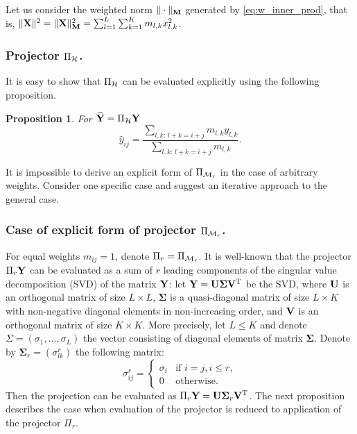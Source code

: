 \documentclass[sii]{ipart}
\newtheorem{proposition}{Proposition}
\begin{document}
Let us consider the weighted norm $\|\cdot\|_{\mathbf{M}}$ generated by \eqref{eq:w_inner_prod}, that is, $\|\mathbf{X}\|^2 = \|\mathbf{X}\|^2_{\mathbf{M}} = \sum_{l = 1}^L \sum_{k = 1}^K m_{l, k} x^2_{l, k}$.

\subsubsection{Projector $\Pi_{\mathcal{H}}$.} It is easy to show that $\Pi_{\mathcal{H}}$
can be evaluated explicitly using the following proposition.

\begin{proposition}
	For $\widehat{\mathbf{Y}}=\Pi_{\mathcal{H}} \mathbf{Y}$
	\begin{equation*}
	\hat{y}_{ij} = \frac{\sum_{l,k:\, l+k=i+j} m_{l,k} y_{l,k}}{\sum_{l,k:\, l+k=i+j} m_{l,k}}.
	\end{equation*}
\end{proposition}

It is impossible to derive an explicit form of $\Pi_{\mathcal{M}_r}$ in the case of arbitrary weights.
Consider one specific case and suggest an iterative approach to the general case.

\subsubsection{Case of explicit form of projector $\Pi_{\mathcal{M}_r}$.}
\label{sec:obliqueSVD}
For equal weights $m_{ij}=1$, denote $\Pi_r=\Pi_{\mathcal{M}_r}$.
It is well-known that the projector $\Pi_{r} \mathbf{Y}$ can be evaluated as a sum of $r$ leading components of the singular value decomposition (SVD) of the matrix $\mathbf{Y}$: let $\mathbf{Y} = \mathbf{U} \mathbf{\Sigma} \mathbf{V}^{\mathrm{T}}$ be the SVD, where $\mathbf{U}$ is an orthogonal matrix of size $L \times L$, $\mathbf{\Sigma}$ is a quasi-diagonal matrix of size $L \times K$ with non-negative diagonal elements in non-increasing order, and $\mathbf{V}$ is an orthogonal matrix of size $K \times K$. More precisely, let $L\le K$ and denote $\Sigma = (\sigma_1, \ldots, \sigma_L)$ the vector consisting of diagonal elements of matrix $\mathbf{\Sigma}$. Denote by $\mathbf{\Sigma}_r = (\sigma^r_{l k})$ the following matrix:
\begin{equation*}
\sigma^r_{i j} = \begin{cases}
\sigma_i & \text{if $i = j, i \le r,$}\\
0 & \text{otherwise}.
\end{cases}
\end{equation*}
Then the projection can be evaluated as $\Pi_{r} \mathbf{Y}  = \mathbf{U} \mathbf{\Sigma}_r \mathbf{V}^{\mathrm{T}}$.
The next proposition describes the case when evaluation of the projector is reduced to application of the projector $\Pi_r$.
\end{document}
